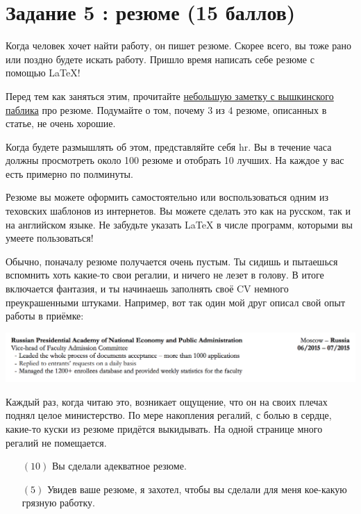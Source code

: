 \documentclass[12pt, a4paper, oneside]{article}
\begin{document}
\section*{Задание 5 :  резюме (15 баллов)}

Когда человек хочет найти работу, он пишет резюме. Скорее всего, вы тоже рано или поздно будете искать работу.  Пришло время написать себе резюме с помощью \LaTeX{}!

Перед тем как заняться этим, прочитайте \href{https://vk.com/@thevyshka-kak-luchshe-oformit-rezume-kommentarii-hr-specialista}{небольшую заметку с вышкинского паблика} про резюме. Подумайте о том, почему $3$ из $4$ резюме, описанных в статье, не очень хорошие. 

Когда будете размышлять об этом, представляйте себя hr. Вы в течение часа должны просмотреть около 100 резюме и отобрать 10 лучших. На каждое у вас есть примерно по полминуты. 

Резюме вы можете оформить самостоятельно или воспользоваться одним из теховских шаблонов из интернетов. Вы можете сделать это как на русском, так и на английском языке. Не забудьте указать  \LaTeX{} в числе программ, которыми вы умеете пользоваться!  

Обычно, поначалу резюме получается очень пустым. Ты сидишь и пытаешься вспомнить хоть какие-то свои регалии, и ничего не лезет в голову. В итоге включается фантазия, и ты начинаешь заполнять своё CV немного преукрашенными штуками. Например, вот так один мой друг описал свой опыт работы в приёмке: 

\begin{center}
	\includegraphics[scale=0.35]{sasha.png}
\end{center}

Каждый раз, когда читаю это, возникает ощущение, что он на своих плечах поднял целое министерство. По мере накопления регалий, с болью в сердце, какие-то куски из резюме придётся выкидывать. На одной странице много регалий не помещается.

\begin{itemize}
	\item[$(10)$] Вы сделали адекватное резюме.
	\item[$(5)$] Увидев ваше резюме, я захотел, чтобы вы сделали для меня кое-какую грязную работку.
\end{itemize}
\end{document}
